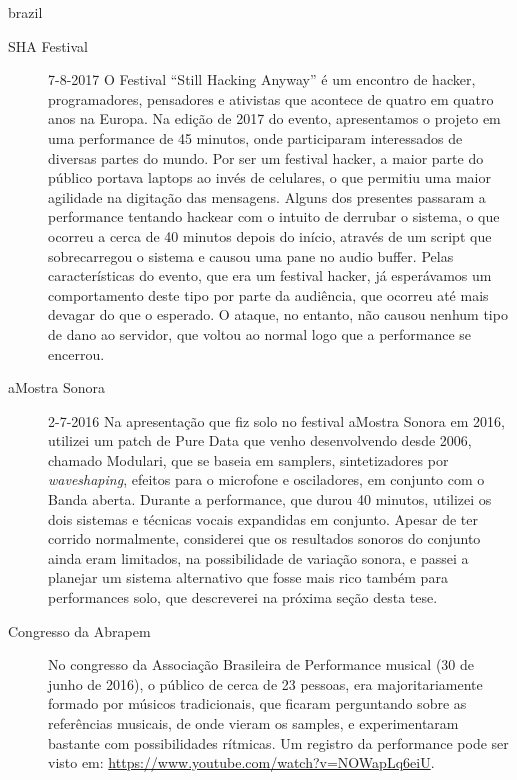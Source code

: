 \begin{otherlanguage*}{brazil}
\begin{description}
\item[SHA Festival] 7-8-2017
O Festival ``Still Hacking Anyway'' é um encontro de hacker, programadores, pensadores e ativistas que acontece de quatro em quatro anos na Europa. Na edição de 2017 do evento, apresentamos o projeto em uma performance de 45 minutos, onde participaram interessados de diversas partes do mundo. Por ser um festival hacker, a maior parte do público portava laptops ao invés de celulares, o que permitiu uma maior agilidade na digitação das mensagens. Alguns dos presentes passaram a performance tentando hackear com o intuito de derrubar o sistema, o que ocorreu a cerca de 40 minutos depois do início, através de um script que sobrecarregou o sistema e causou uma pane no audio buffer. Pelas características do evento, que era um festival hacker,  já esperávamos um comportamento deste tipo por parte da audiência, que ocorreu até mais devagar do que o esperado. O ataque, no entanto, não causou nenhum tipo de dano ao servidor, que voltou ao normal logo que a performance se encerrou.

\item[aMostra Sonora] 2-7-2016
Na apresentação que fiz solo no festival aMostra Sonora em 2016, utilizei um patch de Pure Data que venho desenvolvendo desde 2006, chamado Modulari, que se baseia em samplers, sintetizadores por \emph{waveshaping}, efeitos para o microfone e osciladores, em conjunto com o Banda aberta. Durante a performance, que durou 40 minutos, utilizei os dois sistemas e técnicas vocais expandidas em conjunto. Apesar de ter corrido normalmente, considerei que os resultados sonoros do conjunto ainda eram limitados, na possibilidade de variação sonora, e passei a planejar um sistema alternativo que fosse mais rico também para performances solo, que descreverei na próxima seção desta tese.




\item[Congresso da Abrapem]

No congresso da Associação Brasileira de Performance musical (30 de junho de 2016), o público de cerca de 23 pessoas, era majoritariamente formado por músicos tradicionais, que ficaram perguntando sobre as referências musicais, de onde vieram os samples, e experimentaram bastante com possibilidades rítmicas. Um registro da performance pode ser visto em:  \url{https://www.youtube.com/watch?v=NOWapLq6eiU}.




\end{description}
\end{otherlanguage*}
